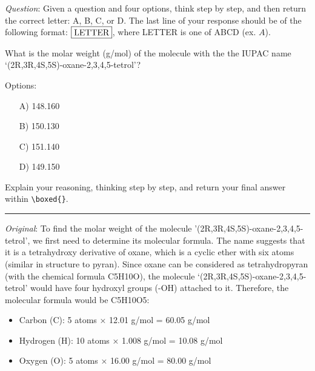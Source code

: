 \documentclass{article}
\begin{document}
\newpage

\begin{center}
\begin{tcolorbox}[
    enhanced,
    width=\linewidth,
    fit to height=20cm,
    colback=green!4,
    colframe=green!50!black,
    boxrule=0.5pt,
    arc=2pt,
    title=\small{Chemistry (Qwen2.5-7B-Instruct)},
    left=2pt,
    right=2pt,
    top=1pt,
    bottom=0pt
]
{\small
\textit{Question}: Given a question and four options, think step by step, and then return the correct letter: A, B, C, or D. The last line of your response should be of the following format: $\boxed{{\text{\rm{LETTER}}}}$, where LETTER is one of ABCD (ex. $\boxed{{A}}$).

\bigskip

What is the molar weight (g/mol) of the molecule with the the IUPAC name `(2R,3R,4S,5S)-oxane-2,3,4,5-tetrol'? 

{Options:}

\begin{itemize}
    \item[A)] 148.160
    \item[B)] 150.130
    \item[C)] 151.140
    \item[D)] 149.150
\end{itemize}

Explain your reasoning, thinking step by step, and return your final answer within \texttt{\textbackslash boxed\{\}}.


\vspace{0.8em}
\noindent\rule{\linewidth}{0.4pt}
\vspace{0.2em}

\textit{Original}: To find the molar weight of the molecule '(2R,3R,4S,5S)-oxane-2,3,4,5-tetrol', we first need to determine its molecular formula. The name suggests that it is a tetrahydroxy derivative of oxane, which is a cyclic ether with six atoms (similar in structure to pyran). Since oxane can be considered as tetrahydropyran (with the chemical formula C5H10O), the molecule `(2R,3R,4S,5S)-oxane-2,3,4,5-tetrol' would have four hydroxyl groups (-OH) attached to it. Therefore, the molecular formula would be C5H10O5:

\begin{itemize}
    \item Carbon (C): 5 atoms × 12.01 g/mol = 60.05 g/mol
    \item Hydrogen (H): 10 atoms × 1.008 g/mol = 10.08 g/mol
    \item Oxygen (O): 5 atoms × 16.00 g/mol = 80.00 g/mol
\end{itemize}

}
\end{tcolorbox}
\end{center}
\end{document}

